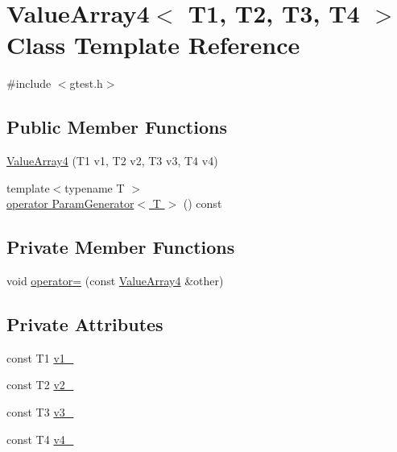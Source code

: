 \hypertarget{classtesting_1_1internal_1_1ValueArray4}{\section{\-Value\-Array4$<$ \-T1, \-T2, \-T3, \-T4 $>$ \-Class \-Template \-Reference}
\label{dc/dea/classtesting_1_1internal_1_1ValueArray4}
}


{\ttfamily \#include $<$gtest.\-h$>$}

\subsection*{\-Public \-Member \-Functions}
\begin{DoxyCompactItemize}
\item 
\hyperlink{classtesting_1_1internal_1_1ValueArray4_aeabaa6f9b35fbcb47038cd8bd6775e16}{\-Value\-Array4} (\-T1 v1, \-T2 v2, \-T3 v3, \-T4 v4)
\item 
{\footnotesize template$<$typename T $>$ }\\\hyperlink{classtesting_1_1internal_1_1ValueArray4_a08ef46fa12c9dd8ef6fc630baeea89b7}{operator Param\-Generator$<$ T $>$} () const 
\end{DoxyCompactItemize}
\subsection*{\-Private \-Member \-Functions}
\begin{DoxyCompactItemize}
\item 
void \hyperlink{classtesting_1_1internal_1_1ValueArray4_a60a44f9a9a1bb26c66a2015f69d90413}{operator=} (const \hyperlink{classtesting_1_1internal_1_1ValueArray4}{\-Value\-Array4} \&other)
\end{DoxyCompactItemize}
\subsection*{\-Private \-Attributes}
\begin{DoxyCompactItemize}
\item 
const \-T1 \hyperlink{classtesting_1_1internal_1_1ValueArray4_aac1d0654cc6c1aceb4a5d0fa7a98042e}{v1\-\_\-}
\item 
const \-T2 \hyperlink{classtesting_1_1internal_1_1ValueArray4_a9f0a8ce6ce2fd27e980c4c51a7a7256a}{v2\-\_\-}
\item 
const \-T3 \hyperlink{classtesting_1_1internal_1_1ValueArray4_a4f8257321a2eab0456239174d6712d5e}{v3\-\_\-}
\item 
const \-T4 \hyperlink{classtesting_1_1internal_1_1ValueArray4_aac184059fee257381ccae81d8d112f85}{v4\-\_\-}
\end{DoxyCompactItemize}


